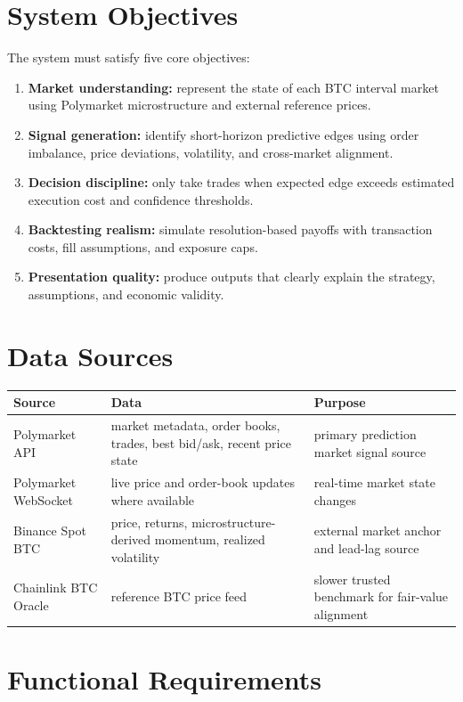 \documentclass[11pt, letterpaper]{article}
\begin{document}
\section{System Objectives}

The system must satisfy five core objectives:

\begin{enumerate}[nosep]
    \item \textbf{Market understanding:} represent the state of each BTC interval market using Polymarket microstructure and external reference prices.
    \item \textbf{Signal generation:} identify short-horizon predictive edges using order imbalance, price deviations, volatility, and cross-market alignment.
    \item \textbf{Decision discipline:} only take trades when expected edge exceeds estimated execution cost and confidence thresholds.
    \item \textbf{Backtesting realism:} simulate resolution-based payoffs with transaction costs, fill assumptions, and exposure caps.
    \item \textbf{Presentation quality:} produce outputs that clearly explain the strategy, assumptions, and economic validity.
\end{enumerate}

\section{Data Sources}

\begin{longtable}{p{3.4cm}p{4.8cm}p{5.0cm}}
\toprule
\textbf{Source} & \textbf{Data} & \textbf{Purpose} \\
\midrule
\endhead
Polymarket API & market metadata, order books, trades, best bid/ask, recent price state & primary prediction market signal source \\
Polymarket WebSocket & live price and order-book updates where available & real-time market state changes \\
Binance Spot BTC & price, returns, microstructure-derived momentum, realized volatility & external market anchor and lead-lag source \\
Chainlink BTC Oracle & reference BTC price feed & slower trusted benchmark for fair-value alignment \\
\bottomrule
\end{longtable}

\section{Functional Requirements}
\end{document}
